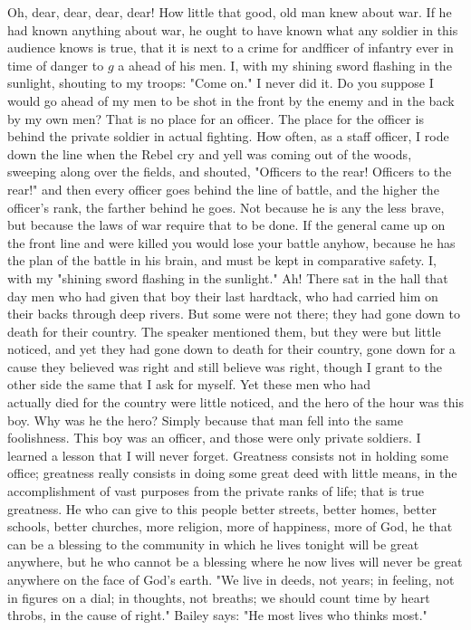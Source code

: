 \documentclass[10pt]{article}
\begin{document}
Oh, dear, dear, dear, dear! How little that good, old man knew about war. If he had known anything about war, he ought to have known what any soldier in this audience knows is true, that it is next to a crime for andfficer of infantry ever in time of danger to $g$ a ahead of his men. I, with my shining sword flashing in the sunlight, shouting to my troops: "Come on." I never did it. Do you suppose I would go ahead of my men to be shot in the front by the enemy and in the back by my own men? That is no place for an officer. The place for the officer is behind the private soldier in actual fighting. How often, as a staff officer, I rode down the line when the Rebel cry and yell was coming out of the woods, sweeping along over the fields, and shouted, "Officers to the rear! Officers to the rear!" and then every officer goes behind the line of battle, and the higher the officer's rank, the farther behind he goes. Not because he is any the less brave, but because the laws of war require that to be done. If the general came up on the front line and were killed you would lose your battle anyhow, because he has the plan of the battle in his brain, and must be kept in comparative safety. I, with my "shining sword flashing in the sunlight." Ah! There sat in the hall that day men who had given that boy their last hardtack, who had carried him on their backs through deep rivers. But some were not there; they had gone down to death for their country. The speaker mentioned them, but they were but little noticed, and yet they had gone down to death for their country, gone down for a cause they believed was right and still believe was right, though I grant to the other side the same that I ask for myself. Yet these men who had\\
actually died for the country were little noticed, and the hero of the hour was this boy. Why was he the hero? Simply because that man fell into the same foolishness. This boy was an officer, and those were only private soldiers. I learned a lesson that I will never forget. Greatness consists not in holding some office; greatness really consists in doing some great deed with little means, in the accomplishment of vast purposes from the private ranks of life; that is true greatness. He who can give to this people better streets, better homes, better schools, better churches, more religion, more of happiness, more of God, he that can be a blessing to the community in which he lives tonight will be great anywhere, but he who cannot be a blessing where he now lives will never be great anywhere on the face of God's earth. "We live in deeds, not years; in feeling, not in figures on a dial; in thoughts, not breaths; we should count time by heart throbs, in the cause of right." Bailey says: "He most lives who thinks most."
\end{document}
